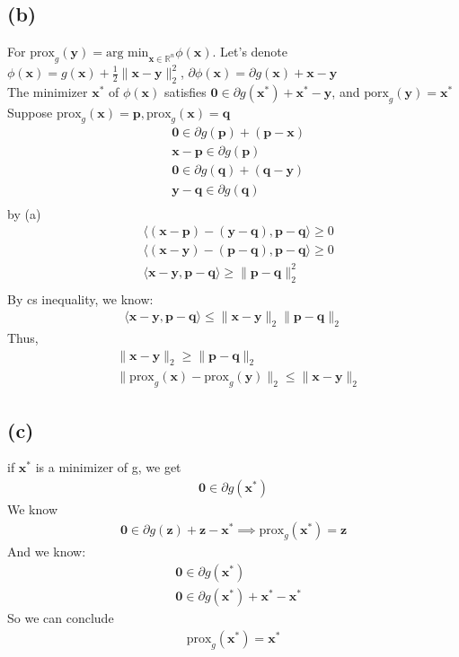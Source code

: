 \documentclass{article}
\newcommand{\R}{\mathbb{R}}
\begin{document}
\subsection*{(b)}
For \(\text{prox}_g(\bm{y}) = \text{arg min}_{\bm{x} \in \R^n} \phi (\bm{x})\). Let's denote \(\phi (\bm{x}) = g(\bm{x}) + \frac{1}{2}\|\bm{x} - \bm{y}\|_2^2\), \(\partial \phi (\bm{x}) = \partial g(\bm{x}) + \bm{x} - \bm{y}\) \\
The minimizer \(\bm{x}^*\) of \(\phi(\bm{x})\) satisfies \(\bm{0} \in \partial g(\bm{x}^*) + \bm{x}^* - \bm{y}\), and \(\text{porx}_g(\bm{y}) = \bm{x}^*\) \\
Suppose \(\text{prox}_g(\bm{x}) = \bm{p}, \text{prox}_g(\bm{x}) = \bm{q}\)
\begin{align*}
    &\bm{0} \in \partial g(\bm{p}) + (\bm{p} - \bm{x}) \\
    &\bm{x} - \bm{p} \in \partial g(\bm{p}) \\
    &\bm{0} \in \partial g(\bm{q}) + (\bm{q} - \bm{y}) \\
    &\bm{y} - \bm{q} \in \partial g(\bm{q}) \\
\end{align*}
by (a)
\begin{align*}
    &\langle (\bm{x} - \bm{p}) - (\bm{y} - \bm{q}), \bm{p} - \bm{q} \rangle \geq 0 \\
    &\langle (\bm{x} - \bm{y}) - (\bm{p} - \bm{q}), \bm{p} - \bm{q} \rangle \geq 0 \\
    &\langle \bm{x} - \bm{y}, \bm{p} - \bm{q} \rangle \geq \| \bm{p} - \bm{q} \|_2^2\\
\end{align*}
By cs inequality, we know:
\begin{align*}
    \langle \bm{x} - \bm{y}, \bm{p} - \bm{q} \rangle \leq \|\bm{x} - \bm{y}\|_2\|\bm{p} - \bm{q}\|_2
\end{align*}
Thus,
\begin{align*}
    & \|\bm{x} - \bm{y}\|_2 \geq \| \bm{p} - \bm{q} \|_2 \\
    &\|\text{prox}_g (\bm{x}) - \text{prox}_g(\bm{y})\|_2 \leq \|\bm{x} - \bm{y}\|_2
\end{align*}

\subsection*{(c)}
if \(\bm{x}^*\) is a minimizer of g, we get
\begin{align*}
    \bm{0} \in \partial g(\bm{x}^*)
\end{align*}
We know
\begin{align*}
    \bm{0} \in \partial g(\bm{z}) + \bm{z} - \bm{x^*} \implies \text{prox}_g(\bm{x}^*) = \bm{z}
\end{align*}
And we know:
\begin{align*}
    &\bm{0} \in \partial g(\bm{x}^*) \\
    &\bm{0} \in \partial g(\bm{x}^*) + \bm{x}^* - \bm{x}^*
\end{align*}
So we can conclude
\begin{align*}
    \text{prox}_g(\bm{x}^*) = \bm{\bm{x}^*}
\end{align*}
\end{document}

